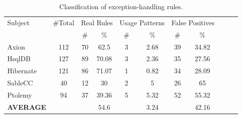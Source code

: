 \setlength{\tabcolsep}{1pt}
\begin{table}[t]
\begin{SmallOut}
\begin{CodeOut}
\begin{center}
\centering \caption {\label{tab:minedpatterns}  Classification of exception-handling rules.}
\begin {tabular} {|l|c|c|c|c|c|c|c|c|c|c|}
\hline
Subject&\#Total&\multicolumn{2}{|c|}{Real Rules}&\multicolumn{2}{|c|}{Usage Patterns}&\multicolumn{2}{|c|}{False Positives}\\
\cline{3-8}
&&\#&\%&\#&\%&\#&\%\\
\hline
\hline Axion&112&70&62.5&3&2.68&39&34.82\\
\hline HsqlDB&127&89&70.08&3&2.36&35&27.56\\
\hline Hibernate&121&86&71.07&1&0.82&34&28.09\\
\hline SableCC&40&12&30&2&5&26&65\\
\hline Ptolemy&94&37&39.36&5&5.32&52&55.32\\
\hline \textbf{AVERAGE}&&&54.6&&3.24&&42.16\\
\hline
\end{tabular}
\end{center}
\end{CodeOut}
\end{SmallOut}\vspace*{-4ex}
\end{table}

